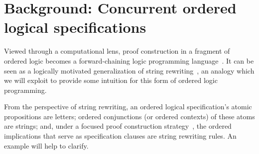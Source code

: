 


% 

% 

\section{Background: Concurrent ordered logical specifications}\label{sec:ordered-lp}

Viewed through a computational lens, proof construction in a fragment of ordered logic becomes a forward-chaining logic programming language~\autocite{Pfenning+Simmons:LICS09}.
It can be seen as a logically motivated generalization of string rewriting~\autocite[see, \eg,][]{Book+Otto:SRS93}, an analogy which we will exploit to provide some intuition for this form of ordered logic programming.

From the perspective of string rewriting, an ordered logical specification's atomic propositions are letters; ordered conjunctions (or ordered contexts) of these atoms are strings; and, under a focused proof construction strategy~\autocite{Andreoli:JLC92}, the ordered implications that serve as specification clauses are string rewriting rules.
An example will help to clarify.






% 
